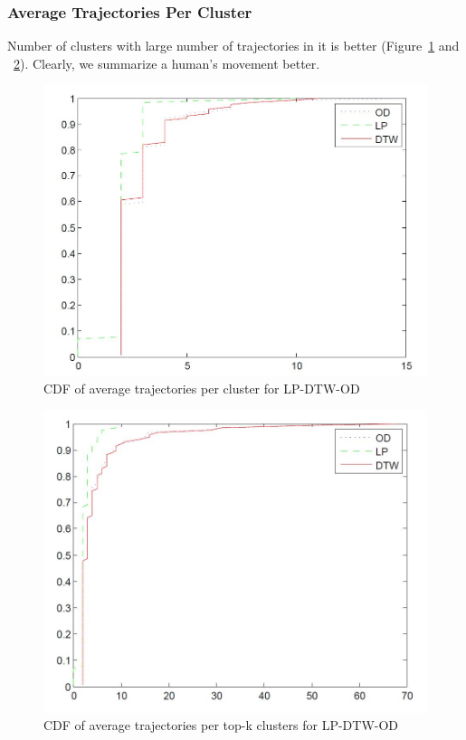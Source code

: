 \subsubsection{Average Trajectories Per Cluster}
Number of clusters with large number of trajectories in it is better (Figure~\ref{fig:avg_cdf} and ~\ref{fig:avgtop_cdf}). Clearly, we summarize a human's movement better.

\begin{figure}[H]
\centering     
\includegraphics[scale=0.3]{figs/avg_cdf.jpg}
\caption{CDF of average trajectories per cluster for LP-DTW-OD}
\label{fig:avg_cdf}  
\end{figure} 

\begin{figure}[H]
\centering     
\includegraphics[scale=0.3]{figs/avgtop_cdf.jpg}
\caption{CDF of average trajectories per top-k clusters for LP-DTW-OD}
\label{fig:avgtop_cdf}  
\end{figure} 


